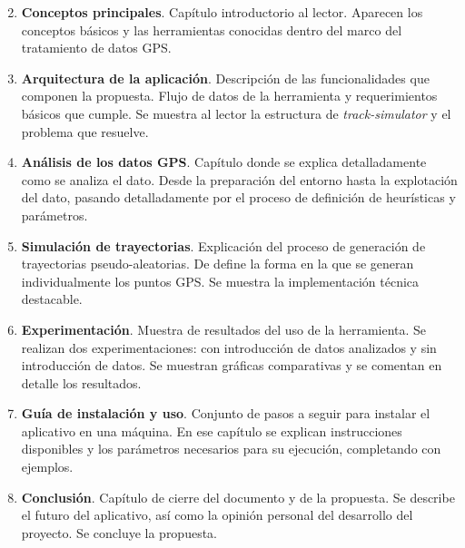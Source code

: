 \begin{enumerate}[label={C. \arabic*.}]
\setcounter{enumi}{1}
\item \textbf{Conceptos principales}. Capítulo introductorio al lector. Aparecen los 
conceptos básicos y las herramientas conocidas dentro del marco del tratamiento de 
datos \ac{GPS}.

\item \textbf{Arquitectura de la aplicación}. Descripción de las funcionalidades que 
componen la propuesta. Flujo de datos de la herramienta y requerimientos básicos que 
cumple. Se muestra al lector la estructura de \textit{track-simulator} y el problema que 
resuelve.

\item \textbf{Análisis de los datos \ac{GPS}}. Capítulo donde se explica detalladamente 
como se analiza el dato. Desde la preparación del entorno hasta la explotación del dato, 
pasando detalladamente por el proceso de definición de heurísticas y parámetros.


\item \textbf{Simulación de trayectorias}. Explicación del proceso de generación de 
trayectorias pseudo-aleatorias. De define la forma en la que se generan 
individualmente los puntos \ac{GPS}. Se muestra la implementación técnica 
destacable.

\item \textbf{Experimentación}. Muestra de resultados del uso de la herramienta. Se 
realizan dos experimentaciones: con introducción de datos analizados y sin 
introducción de datos. Se muestran gráficas comparativas y se comentan en detalle los 
resultados.

\item \textbf{Guía de instalación y uso}. Conjunto de pasos a seguir para instalar el 
aplicativo en una máquina. En ese capítulo se explican instrucciones disponibles y los 
parámetros necesarios para su ejecución, completando con ejemplos.

\item \textbf{Conclusión}. Capítulo de cierre del documento y de la propuesta. Se 
describe el futuro del aplicativo, así como la opinión personal del desarrollo del 
proyecto. Se concluye la propuesta.
\end{enumerate}